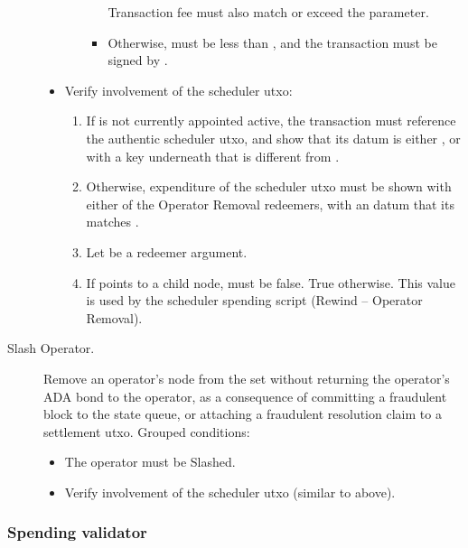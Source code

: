 \documentclass[../midgard.tex]{subfiles}
\begin{document}
\begin{description}
\begin{itemize}
\begin{enumerate}[resume]
\begin{itemize}
                    Transaction fee must also match or exceed the  parameter.
                  \item Otherwise,  must be less than , and the transaction must be signed by .
                \end{itemize}
            \end{enumerate}
          \item Verify involvement of the scheduler utxo:
            \begin{enumerate}[resume]
              \item If  is not currently appointed active, the transaction must reference the authentic scheduler utxo, and show that its datum is either , or  with a key underneath that is different from .
              \item Otherwise, expenditure of the scheduler utxo must be shown with either of the Operator Removal redeemers, with an  datum that its  matches .
              \item Let  be a redeemer argument.
              \item If  points to a child node,  must be false. True otherwise.
                This value is used by the scheduler spending script (Rewind -- Operator Removal).
            \end{enumerate}
        \end{itemize}
    \item[Slash Operator.] Remove an operator's node from the  set without returning the operator's ADA bond to the operator, as a consequence of committing a fraudulent block to the state queue, or attaching a fraudulent resolution claim to a settlement utxo.
      Grouped conditions:
        \begin{itemize}
            \item The operator must be Slashed.
            \item Verify involvement of the scheduler utxo (similar to above).
        \end{itemize}
\end{description}

\subsubsection{Spending validator}
\label{h:active-operators-spending-validator}
\end{document}
